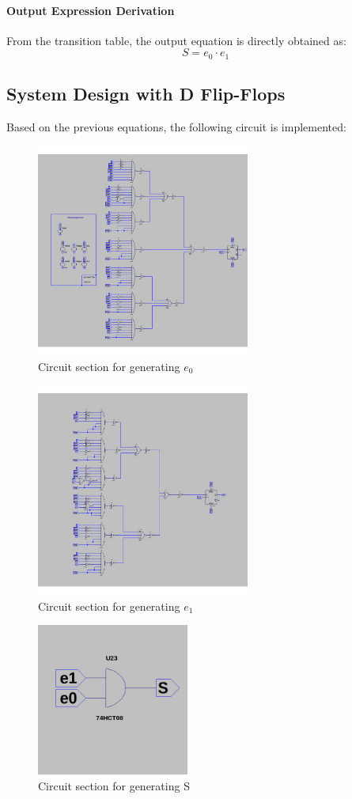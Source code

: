 \paragraph{Output Expression Derivation}
From the transition table, the output equation is directly obtained as:  
\[ S = e_0 \cdot e_1 \]

\newpage
\subsection{System Design with D Flip-Flops}
Based on the previous equations, the following circuit is implemented:

\begin{figure}[H]
\centering
\includegraphics[height=7cm]{img/circuitE1.jpg}
\caption{Circuit section for generating $e_0$}
\end{figure}

\begin{figure}[H]
\centering
\includegraphics[height=7cm]{img/circuitE2.jpg}
\caption{Circuit section for generating $e_1$}
\end{figure}

\begin{figure}[H]
\centering
\includegraphics[height=5cm]{img/circuitS.jpg}
\caption{Circuit section for generating S}
\end{figure}

